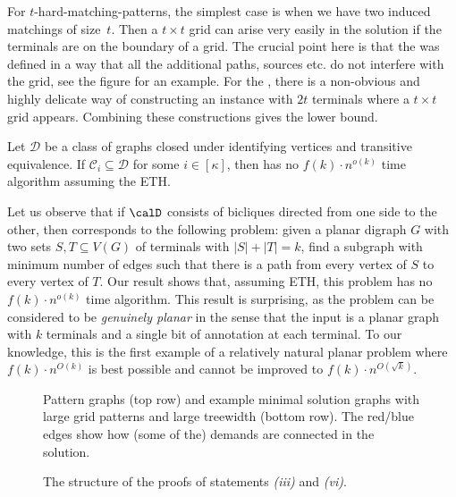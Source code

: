 For $t$-hard-matching-patterns, the simplest case is when we have two induced matchings of size~$t$. Then a $t\times t$ grid can arise very easily in the solution if the terminals are on the boundary of a grid. The crucial point here is that the  was defined in a way that all the additional paths, sources etc. do not interfere with the grid, see the figure for an example. For the , there is a non-obvious and highly delicate way of constructing an instance with $2t$ terminals where a $t\times t$ grid appears. Combining these constructions gives the lower bound. 

 \begin{theorem}
 \label{thm:hardlowerbound}
Let $\mathcal{D}$ be a class of graphs closed under identifying vertices and transitive equivalence.
If $\mathcal{C}_i \subseteq \mathcal{D}$ for some $i \in[\kappa]$, then \Dsnfull has no $f(k) \cdot n^{o(k)}$ time algorithm assuming the ETH.
 \end{theorem}

 Let us observe that if $\calD$ consists of bicliques directed from one side to the other, then \Dsn corresponds to the following problem: given a planar digraph $G$ with two sets $S,T\subseteq V(G)$ of terminals with $|S|+|T|=k$, find a subgraph with minimum number of edges such that there is a path from every vertex of $S$ to every vertex of $T$. Our result shows that, assuming ETH, this problem has no $f(k) \cdot n^{o(k)}$ time algorithm. This result is surprising, as the problem can be considered to be \emph{genuinely planar} in the sense that the input is a planar graph with $k$ terminals and a single bit of annotation at each terminal. To our knowledge, this is the first example of a relatively natural planar problem where $f(k) \cdot n^{O(k)}$ is best possible and cannot be improved to $f(k) \cdot n^{O(\sqrt{k})}$.

 \begin{figure}[t]
{\footnotesize {}}
\caption{Pattern graphs (top row) and example minimal solution graphs with large grid patterns and large treewidth (bottom row). The red/blue edges show how (some of the) demands are connected in the solution.}\label{fig:largetw}
\end{figure}   

  \begin{figure}[t]
    \begin{center}
\end{center}
\caption{The structure of the proofs of statements \textit{(iii)} and \textit{(vi)}.}\label{fig:chain}
\end{figure}

